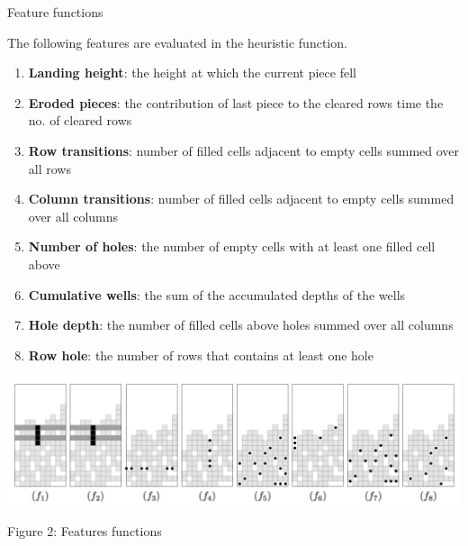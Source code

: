 \documentclass[a4paper,11pt]{resume}
\begin{document}
\begin{rSection}{{\heading Feature functions}}
\begin{rSubsection}{}{}{}{}
\vspace{-5pt}
\item The following features are evaluated in the heuristic function.
\vspace{-5pt}
\begin{enumerate}
    \item {\bf{Landing height}}: the height at which the current piece fell
    \vspace{-5pt}
    \item {\bf{Eroded pieces}}: the contribution of last piece to the cleared rows time the no. of cleared rows
    \vspace{-20pt}
    \item {\bf{Row transitions}}: number of filled cells adjacent to empty cells summed over all rows
    \vspace{-5pt}
    \item {\bf{Column transitions}}: number of filled cells adjacent to empty cells summed over all columns
    \vspace{-5pt}
    \item {\bf{Number of holes}}: the number of empty cells with at least one filled cell above
    \vspace{-5pt}
    \item {\bf{Cumulative wells}}: the sum of the accumulated depths of the wells
    \vspace{-5pt}
    \item {\bf{Hole depth}}: the number of filled cells above holes summed over all columns
    \vspace{-5pt}
    \item {\bf{Row hole}}: the number of rows that contains at least one hole
\end{enumerate}
\centering
\includegraphics[width=\textwidth,scale=0.4]{features.png}
\label{fig:find}
\caption{Figure 2: Features functions}
\end{rSubsection}
\end{rSection}
\end{document}
